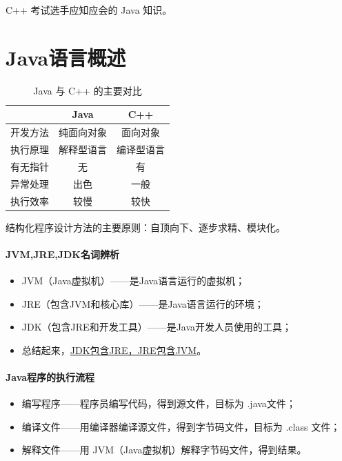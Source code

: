\documentclass[UTF8]{ctexart}
\newcommand\Emph[1]{\colorbox{green!10}{\textcolor{green!30!black}{#1}}}
\begin{document}
{\color{cyan!50!black}
C++ 考试选手应知应会的 Java 知识。
}

\section{Java语言概述}

\begin{table}[htb]
  \centering
  \begin{tabular}{ccc}
  \toprule
    & Java & C++ \\
  \midrule
  开发方法 & 纯面向对象 & 面向对象 \\
  执行原理 & 解释型语言 & 编译型语言 \\
  有无指针 & 无 & 有 \\
  异常处理 & 出色 & 一般 \\
  执行效率 & 较慢 & 较快 \\
  \bottomrule
  \end{tabular}
  \caption{Java 与 C++ 的主要对比}\label{tab:java-and-c++}
\end{table}

结构化程序设计方法的主要原则：自顶向下、逐步求精、模块化。

\paragraph{JVM,JRE,JDK名词辨析}

\begin{itemize}[itemsep=0pt,parsep=0pt]
  \item \Emph{JVM}（Java虚拟机）——是Java语言运行的虚拟机；
  \item \Emph{JRE}（包含JVM和核心库）——是Java语言运行的环境；
  \item \Emph{JDK}（包含JRE和开发工具）——是Java开发人员使用的工具；
  \item 总结起来，\underline{JDK包含JRE，JRE包含JVM}。
\end{itemize}

\paragraph{Java程序的执行流程}

\begin{itemize}[itemsep=0pt,parsep=0pt]
  \item \Emph{编写程序}——程序员编写代码，得到源文件，目标为 \Emph{.java文件}；
  \item \Emph{编译文件}——用编译器编译源文件，得到字节码文件，目标为 \Emph{.class 文件}；
  \item \Emph{解释文件}——用 JVM（Java虚拟机）解释字节码文件，得到结果。
\end{itemize}
\end{document}
